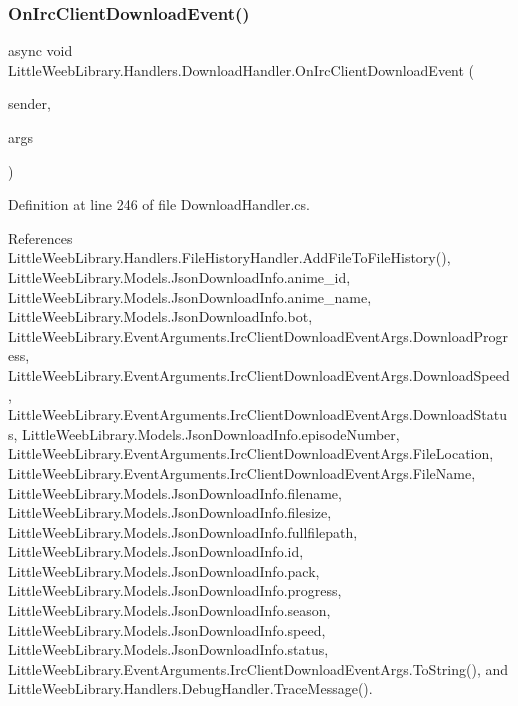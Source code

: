 \subsubsection{\texorpdfstring{On\+Irc\+Client\+Download\+Event()}{OnIrcClientDownloadEvent()}}
{\footnotesize\ttfamily async void Little\+Weeb\+Library.\+Handlers.\+Download\+Handler.\+On\+Irc\+Client\+Download\+Event (\begin{DoxyParamCaption}\item[{object}]{sender,  }\item[{\mbox{\hyperlink{class_little_weeb_library_1_1_event_arguments_1_1_irc_client_download_event_args}{Irc\+Client\+Download\+Event\+Args}}}]{args }\end{DoxyParamCaption})\hspace{0.3cm}{\ttfamily [private]}}



Definition at line 246 of file Download\+Handler.\+cs.



References Little\+Weeb\+Library.\+Handlers.\+File\+History\+Handler.\+Add\+File\+To\+File\+History(), Little\+Weeb\+Library.\+Models.\+Json\+Download\+Info.\+anime\+\_\+id, Little\+Weeb\+Library.\+Models.\+Json\+Download\+Info.\+anime\+\_\+name, Little\+Weeb\+Library.\+Models.\+Json\+Download\+Info.\+bot, Little\+Weeb\+Library.\+Event\+Arguments.\+Irc\+Client\+Download\+Event\+Args.\+Download\+Progress, Little\+Weeb\+Library.\+Event\+Arguments.\+Irc\+Client\+Download\+Event\+Args.\+Download\+Speed, Little\+Weeb\+Library.\+Event\+Arguments.\+Irc\+Client\+Download\+Event\+Args.\+Download\+Status, Little\+Weeb\+Library.\+Models.\+Json\+Download\+Info.\+episode\+Number, Little\+Weeb\+Library.\+Event\+Arguments.\+Irc\+Client\+Download\+Event\+Args.\+File\+Location, Little\+Weeb\+Library.\+Event\+Arguments.\+Irc\+Client\+Download\+Event\+Args.\+File\+Name, Little\+Weeb\+Library.\+Models.\+Json\+Download\+Info.\+filename, Little\+Weeb\+Library.\+Models.\+Json\+Download\+Info.\+filesize, Little\+Weeb\+Library.\+Models.\+Json\+Download\+Info.\+fullfilepath, Little\+Weeb\+Library.\+Models.\+Json\+Download\+Info.\+id, Little\+Weeb\+Library.\+Models.\+Json\+Download\+Info.\+pack, Little\+Weeb\+Library.\+Models.\+Json\+Download\+Info.\+progress, Little\+Weeb\+Library.\+Models.\+Json\+Download\+Info.\+season, Little\+Weeb\+Library.\+Models.\+Json\+Download\+Info.\+speed, Little\+Weeb\+Library.\+Models.\+Json\+Download\+Info.\+status, Little\+Weeb\+Library.\+Event\+Arguments.\+Irc\+Client\+Download\+Event\+Args.\+To\+String(), and Little\+Weeb\+Library.\+Handlers.\+Debug\+Handler.\+Trace\+Message().


